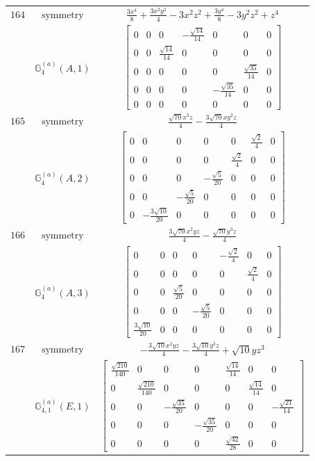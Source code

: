 \documentclass[fleqn,8pt,landscape]{jsarticle}
\begin{document}
\begin{longtable}{ccc}
$ 164 $ & $ \text{symmetry} $ & $ \frac{3 x^{4}}{8} + \frac{3 x^{2} y^{2}}{4} - 3 x^{2} z^{2} + \frac{3 y^{4}}{8} - 3 y^{2} z^{2} + z^{4} $ \\
$  $ & $ \mathbb{G}_{4}^{(a)}(A,1) $ & $ \begin{bmatrix} 0 & 0 & 0 & - \frac{\sqrt{14}}{14} & 0 & 0 & 0 \\ 0 & 0 & \frac{\sqrt{14}}{14} & 0 & 0 & 0 & 0 \\ 0 & 0 & 0 & 0 & 0 & \frac{\sqrt{35}}{14} & 0 \\ 0 & 0 & 0 & 0 & - \frac{\sqrt{35}}{14} & 0 & 0 \\ 0 & 0 & 0 & 0 & 0 & 0 & 0 \end{bmatrix} $ \\ \hline
$ 165 $ & $ \text{symmetry} $ & $ \frac{\sqrt{70} x^{3} z}{4} - \frac{3 \sqrt{70} x y^{2} z}{4} $ \\
$  $ & $ \mathbb{G}_{4}^{(a)}(A,2) $ & $ \begin{bmatrix} 0 & 0 & 0 & 0 & 0 & \frac{\sqrt{2}}{4} & 0 \\ 0 & 0 & 0 & 0 & \frac{\sqrt{2}}{4} & 0 & 0 \\ 0 & 0 & 0 & - \frac{\sqrt{5}}{20} & 0 & 0 & 0 \\ 0 & 0 & - \frac{\sqrt{5}}{20} & 0 & 0 & 0 & 0 \\ 0 & - \frac{3 \sqrt{10}}{20} & 0 & 0 & 0 & 0 & 0 \end{bmatrix} $ \\ \hline
$ 166 $ & $ \text{symmetry} $ & $ \frac{3 \sqrt{70} x^{2} y z}{4} - \frac{\sqrt{70} y^{3} z}{4} $ \\
$  $ & $ \mathbb{G}_{4}^{(a)}(A,3) $ & $ \begin{bmatrix} 0 & 0 & 0 & 0 & - \frac{\sqrt{2}}{4} & 0 & 0 \\ 0 & 0 & 0 & 0 & 0 & \frac{\sqrt{2}}{4} & 0 \\ 0 & 0 & \frac{\sqrt{5}}{20} & 0 & 0 & 0 & 0 \\ 0 & 0 & 0 & - \frac{\sqrt{5}}{20} & 0 & 0 & 0 \\ \frac{3 \sqrt{10}}{20} & 0 & 0 & 0 & 0 & 0 & 0 \end{bmatrix} $ \\ \hline
$ 167 $ & $ \text{symmetry} $ & $ - \frac{3 \sqrt{10} x^{2} y z}{4} - \frac{3 \sqrt{10} y^{3} z}{4} + \sqrt{10} y z^{3} $ \\
$  $ & $ \mathbb{G}_{4,1}^{(a)}(E,1) $ & $ \begin{bmatrix} \frac{\sqrt{210}}{140} & 0 & 0 & 0 & \frac{\sqrt{14}}{14} & 0 & 0 \\ 0 & \frac{\sqrt{210}}{140} & 0 & 0 & 0 & \frac{\sqrt{14}}{14} & 0 \\ 0 & 0 & - \frac{\sqrt{35}}{20} & 0 & 0 & 0 & - \frac{\sqrt{21}}{14} \\ 0 & 0 & 0 & - \frac{\sqrt{35}}{20} & 0 & 0 & 0 \\ 0 & 0 & 0 & 0 & \frac{\sqrt{42}}{28} & 0 & 0 \end{bmatrix} $ \\ \hline

\end{longtable}
\end{document}
